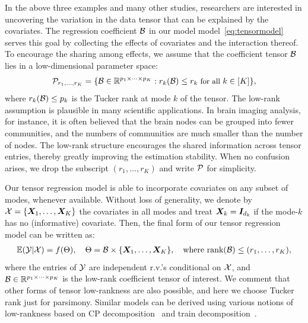 \documentclass{article}
\theoremstyle{plain}
\theoremstyle{definition}
\begin{document}
In the above three examples and many other studies, researchers are interested in uncovering the variation in the data tensor that can be explained by the covariates. The regression coefficient $\mathcal{B}$ in our model model~\eqref{eq:tensormodel} serves this goal by collecting the effects of covariates and the interaction thereof.  
To encourage the sharing among effects, we assume that the coefficient tensor $\mathcal{B}$ lies in a low-dimensional parameter space:
\begin{equation}\label{eq:rank}
\small \tP_{r_1,\ldots,r_K}=\{\tB\in\mathbb{R}^{p_1\times \cdots \times p_K}: r_k(\tB)\leq r_k \text{ for all } k\in[K]\},
\end{equation}
where $r_k(\mathcal{B})\leq p_k$ is the Tucker rank at mode $k$ of the tensor. The low-rank assumption is plausible in many scientific applications. In brain imaging analysis, for instance, it is often believed that the brain nodes can be grouped into fewer communities, and the numbers of communities are much smaller than the number of nodes. The low-rank structure encourages the shared information across tensor entries, thereby greatly improving the estimation stability. When no confusion arises, we drop the subscript $(r_1,\ldots,r_K)$ and write $\mathcal{P}$ for simplicity.


Our tensor regression model is able to incorporate covariates on any subset of modes, whenever available. Without loss of generality, we denote by $\mathcal{X}=\{\bm X_1,\ldots,\bm X_K\}$ the covariates in all modes and treat $\bm X_k=\bm I_{d_k}$ if the mode-$k$ has no (informative) covariate. Then, the final form of our tensor regression model can be written as:
\begin{align}\label{eq:tensormodel2}
\mathbb{E}(\tY|\tX)=f(\Theta),\quad \Theta =\tB\times\{\mX_1,\ldots,\mX_K\},\quad  \text{where}\ \text{rank}(\tB)\leq (r_1,\ldots,r_K),
\end{align}
where the entries of $\mathcal{Y}$ are independent r.v.'s conditional on $\mathcal{X}$, and $\mathcal{B}\in\mathbb{R}^{p_1\times \cdots\times p_K}$ is the low-rank coefficient tensor of interest. We comment that other forms of tensor low-rankness are also possible, and here we choose Tucker rank just for parsimony. Similar models can be derived using various notions of low-rankness based on CP decomposition~\cite{hitchcock1927expression} and train decomposition~\cite{oseledets2011tensor}. 
\vspace{-.2cm}
\end{document}
